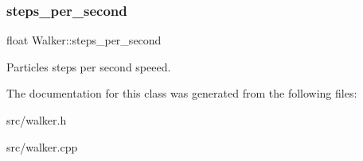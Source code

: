 \subsubsection{\texorpdfstring{steps\+\_\+per\+\_\+second}{steps\_per\_second}}
{\footnotesize\ttfamily float Walker\+::steps\+\_\+per\+\_\+second}

Particles steps per second speeed. 

The documentation for this class was generated from the following files\+:\begin{DoxyCompactItemize}
\item 
src/walker.\+h\item 
src/walker.\+cpp\end{DoxyCompactItemize}
